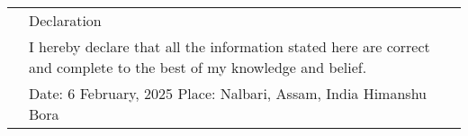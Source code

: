 \documentclass[a4paper, 11pt]{article}
\newcommand{\headingfont}{\Large\color{Bittersweet}}
\newenvironment{SectionTable}[1]{
	\renewcommand*{\arraystretch}{1.7}
	\setlength{\tabcolsep}{10pt}
	\begin{longtable}{Rp{5.2in}} & #1 \\}
{\end{longtable}\vspace{-.3cm}}
\begin{document}
\begin{SectionTable}{\headingfont Declaration}
& I hereby declare that all the information stated here are correct and complete to the best of my knowledge and belief. \\



& Date: 	6 February, 2025	\newline							          
Place:	 Nalbari, Assam, India \hfill  Himanshu Bora \\
\end{SectionTable}

\end{document}
